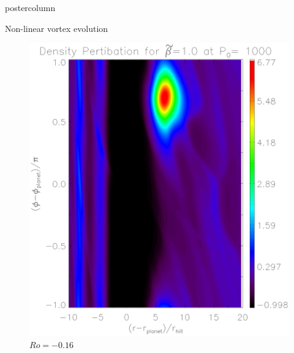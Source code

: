 \documentclass[final,hyperref={pdfpagelabels=false}]{beamer}
\begin{document}
\begin{frame}
\begin{columns}
\begin{column}{.49\textwidth}
\begin{beamercolorbox}[center,wd=\textwidth]{postercolumn}
\begin{minipage}[T]{.95\textwidth}
{\begin{block}{\Large{Non-linear vortex evolution}}
                  \begin{figure}
                    \centering
                    \hfill
                    \begin{minipage}{0.3\textwidth}
                      \includegraphics[width=\textwidth]{Posterfig_Before}
                      \caption{$Ro=-0.16$}
                    \end{minipage}
                    \hfill
                    \begin{minipage}{0.3\textwidth}

\end{minipage}
\end{figure}
\end{block}}
\end{minipage}
\end{beamercolorbox}
\end{column}
\end{columns}
\end{frame}
\end{document}
